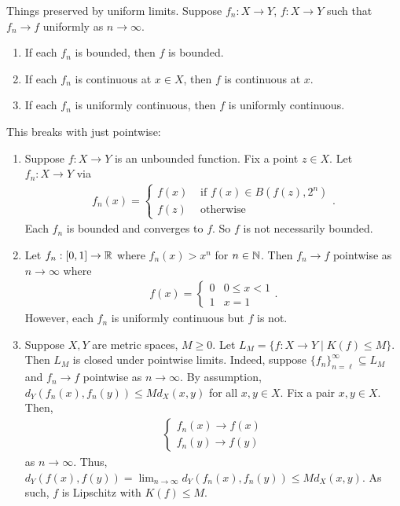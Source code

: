 \documentclass{report}
\begin{document}
\noindent Things preserved by uniform limits. Suppose $f_n : X \to Y$, $f: X \to Y$ such that $f_n \to f$ uniformly as $n \to \infty$.
\begin{enumerate}
    \item If each $f_n$ is bounded, then $f$ is bounded.
    \item If each $f_n$ is continuous at $x\in X$, then $f$ is continuous at $x$.
    \item If each $f_n$ is uniformly continuous, then $f$ is uniformly continuous.
\end{enumerate}
\noindent This breaks with just pointwise:
\begin{enumerate}
    \item Suppose $f: X \to Y$ is an unbounded function. Fix a point $z \in X$. Let $f_n : X\to Y$ via
    \begin{align*}
        f_n(x) = \begin{cases}
        f(x) & \text{ if $f(x) \in B(f(z), 2^n)$} \\
        f(z) & \text{ otherwise}
        \end{cases}.
    \end{align*}
    Each $f_n$ is bounded and converges to $f$. So $f$ is not necessarily bounded.
    \item Let $f_n : [0, 1]\to \RR$ where $f_n(x) > x^n$ for $n \in \NN$. Then $f_n \to f$ pointwise as $n \to \infty$ where 
    \begin{align*}
        f(x) = \begin{cases} 0 & 0 \leq x < 1 \\
        1 & x = 1
        \end{cases}.
    \end{align*}
    However, each $f_n$ is uniformly continuous but $f$ is not.
    \item Suppose $X, Y$ are metric spaces, $M \geq 0$. Let $L_M = \{f: X \to Y \mid K(f) \leq M\}$. Then $L_M$ is closed under pointwise limits. Indeed, suppose $\{f_n\}_{n=\ell}^\infty \subseteq L_M$ and $f_n \to f$ pointwise as $n \to \infty$. By assumption, $d_Y(f_n(x), f_n(y)) \leq Md_X(x, y)$ for all $x, y \in X$. Fix a pair $x, y\in X$. Then,
    \begin{align*}
        \begin{cases}
            f_n(x) \to f(x) \\
            f_n(y) \to f(y)
        \end{cases}
    \end{align*}
    as $n \to \infty$. Thus, $d_Y(f(x), f(y)) = \lim_{n\to \infty} d_Y(f_n(x), f_n(y)) \leq Md_X(x, y)$. As such, $f$ is Lipschitz with $K(f) \leq M$.
\end{enumerate}
\end{document}

